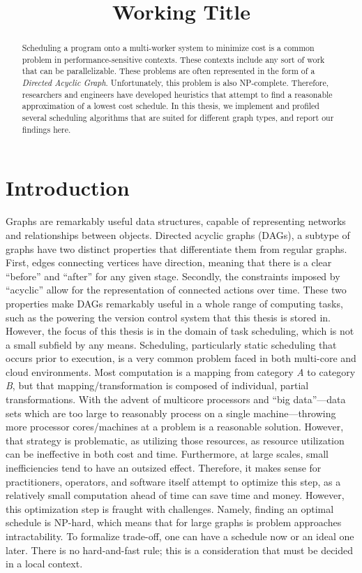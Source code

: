 \documentclass[11pt, oneside]{article}   	%
\title{Working Title}
\date{}
\begin{document}
\maketitle

\begin{abstract}

Scheduling a program onto a multi-worker system to minimize cost is a common problem in performance-sensitive contexts. These contexts include any sort of work that can be parallelizable. These problems are often represented in the form of a \emph{Directed Acyclic Graph}. Unfortunately, this problem is also NP-complete. Therefore, researchers and engineers have developed heuristics that attempt to find a reasonable approximation of a lowest cost schedule. In this thesis, we implement and profiled several scheduling algorithms that are suited for different graph types, and report our findings here.

\end{abstract}

\section{Introduction}

Graphs are remarkably useful data structures, capable of representing networks and relationships between objects. Directed acyclic graphs (DAGs), a subtype of graphs have two distinct properties that differentiate them from regular graphs. First, edges connecting vertices have direction, meaning that there is a clear ``before'' and ``after'' for any given stage. Secondly, the constraints imposed by ``acyclic'' allow for the representation of connected actions over time. These two properties make DAGs remarkably useful in a whole range of computing tasks, such as the powering the version control system that this thesis is stored in. However, the focus of this thesis is in the domain of task scheduling, which is not a small subfield by any means. Scheduling, particularly static scheduling that occurs prior to execution, is a very common problem faced in both multi-core and cloud environments. Most computation is a mapping from category \emph{A} to category \emph{B}, but that mapping/transformation is composed of individual, partial transformations. With the advent of multicore processors and ``big data''---data sets which are too large to reasonably process on a single machine---throwing more processor cores/machines at a problem is a reasonable solution. However, that strategy is problematic, as utilizing those resources, as resource utilization can be ineffective in both cost and time. Furthermore, at large scales, small inefficiencies tend to have an outsized effect. Therefore, it makes sense for practitioners, operators, and software itself attempt to optimize this step, as a relatively small computation ahead of time can save time and money. However, this optimization step is fraught with challenges. Namely, finding an optimal schedule is NP-hard, which means that for large graphs is problem approaches intractability. To formalize trade-off, one can have a schedule now or an ideal one later. There is no hard-and-fast rule; this is a consideration that must be decided in a local context.
\end{document}
